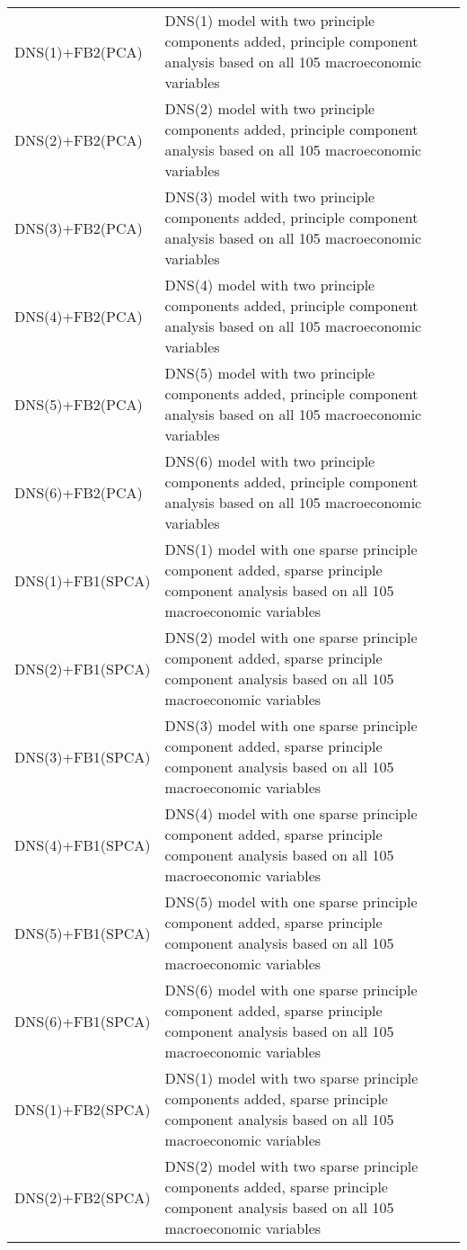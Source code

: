 \begin{footnotesize}
\begin{tabularx}{\linewidth}{lX}
DNS(1)+FB2(PCA)           & DNS(1) model with two principle components added, principle component analysis based on all 105 macroeconomic variables \\
DNS(2)+FB2(PCA)           & DNS(2) model with two principle components added, principle component analysis based on all 105 macroeconomic variables \\
DNS(3)+FB2(PCA)           & DNS(3) model with two principle components added, principle component analysis based on all 105 macroeconomic variables \\
DNS(4)+FB2(PCA)           & DNS(4) model with two principle components added, principle component analysis based on all 105 macroeconomic variables \\
DNS(5)+FB2(PCA)           & DNS(5) model with two principle components added, principle component analysis based on all 105 macroeconomic variables \\
DNS(6)+FB2(PCA)           & DNS(6) model with two principle components added, principle component analysis based on all 105 macroeconomic variables \\
DNS(1)+FB1(SPCA)          & DNS(1) model with one sparse principle component added, sparse principle component analysis based on all 105 macroeconomic variables \\
DNS(2)+FB1(SPCA)          & DNS(2) model with one sparse principle component added, sparse principle component analysis based on all 105 macroeconomic variables \\
DNS(3)+FB1(SPCA)          & DNS(3) model with one sparse principle component added, sparse principle component analysis based on all 105 macroeconomic variables \\
DNS(4)+FB1(SPCA)          & DNS(4) model with one sparse principle component added, sparse principle component analysis based on all 105 macroeconomic variables \\
DNS(5)+FB1(SPCA)          & DNS(5) model with one sparse principle component added, sparse principle component analysis based on all 105 macroeconomic variables \\
DNS(6)+FB1(SPCA)          & DNS(6) model with one sparse principle component added, sparse principle component analysis based on all 105 macroeconomic variables \\
DNS(1)+FB2(SPCA)          & DNS(1) model with two sparse principle components added, sparse principle component analysis based on all 105 macroeconomic variables \\
DNS(2)+FB2(SPCA)          & DNS(2) model with two sparse principle components added, sparse principle component analysis based on all 105 macroeconomic variables \\

\end{tabularx}
\end{footnotesize}
